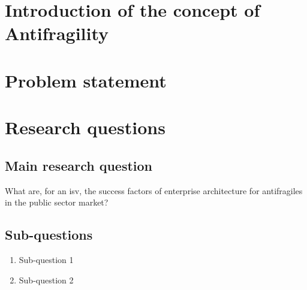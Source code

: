 \section{Introduction of the concept of Antifragility}
\label{sec:introantifragility}
\lipsum[1]

\section{Problem statement}
\label{sec:problemstatement}

\section{Research questions}
\label{sec:research-questions}

\subsection{Main research question}
\label{sub:main-research-question}
What are, for an \acrlong{isv}, the success factors of enterprise architecture for \glspl{antifragile} in the public sector market?

\subsection{Sub-questions}
\label{sub:sub-questions}

\begin{enumerate}
	\item{Sub-question 1}
	\item{Sub-question 2}
\end{enumerate}
